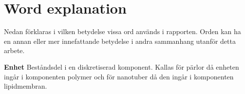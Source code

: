 
\newcommand{\wordexpl}[2]{%
	\indent\textbf{#1}\hspace*{.2cm}#2\\
}

\chapter*{Word explanation}

\setlength\columnsep{25pt}
\begin{multicols}{2}
\noindent
Nedan förklaras i vilken betydelse vissa ord används i rapporten. Orden kan ha en annan eller mer innefattande betydelse i andra sammanhang utanför detta arbete.
    \vspace*{.8cm}

	\wordexpl{Enhet}{
	    Beståndsdel i en diskretiserad komponent. Kallas för pärlor då enheten ingår i komponenten polymer och för nanotuber då den ingår i komponenten lipidmembran.}
	
\end{multicols}

\newpage
